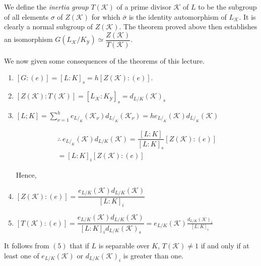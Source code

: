 We define the \textit{inertia group} $T(\mathscr{K})$ of a prime
divisor $\mathscr{K}$ of $L$ to be the subgroup of all elements
$\sigma$ of $Z(\mathscr{K})$ for which  $\bar{\sigma}$ is the identity
automorphism of $L_\mathscr{K}$. It is clearly a normal subgroup of
$Z(\mathscr{K})$. The theorem proved above then establishes an
isomorphism $G(L_\mathscr{K} / K_\mathscr{Y}) \simeq
\dfrac{Z(\mathscr{K})}{T(\mathscr{K})}$. 

We now given some consequences of the theorems of this lecture.
\begin{enumerate}
\item $[G: (e)]= [L:K]_s = h[Z(\mathscr{K}):(e)]$. 
\item $[Z(\mathscr{K}): T(\mathscr{K})]= [ L_\mathscr{K} :
  K_\mathscr{Y}]_s =d_{L /K}{(\mathscr{K})}_s$ 
\item $[L;K] = \sum\limits_{\nu = 1}^{h} e_{L /_K}(\mathscr{K}_\nu)
  d_{L /_K}(\mathscr{K}_\nu) =h e_{L / _K}(\mathscr{K}) d_{L /_K}
  (\mathscr{K})$ 

  \begin{multline*}
    \therefore ~e_{L / _K}(\mathscr{K}) d_{L /K}(\mathscr{K}) =
    \dfrac{[L:K]}{[L:K]_s} [Z(\mathscr{K}):(e)]\\
    = {[L:K]_i [Z(\mathscr{K}): (e)]} 
  \end{multline*} 

 Hence,\pageoriginale 
\item $[Z(\mathscr{K}) : (e) ] = \dfrac{e_{L/K}{(\mathscr{K})}
  d_{L/K} {(\mathscr{K})}}{[L:K]_i}$ 
\item $[T(\mathscr{K}) :(e) ] = \dfrac{{e_{L /K} {(\mathscr{K})}
    d_{L/K} {(\mathscr{K})}}}{[L : K]_i d_{L/K}{(\mathscr{K})}_s} =e_{L/
  K} (\mathscr{K}) \frac{d_{L/K}(\mathscr{K})_i}{[L : K]_i}$ 
\end{enumerate}

It follows from $(5)$ that if $L$ is separable over $K$,
$T(\mathscr{K}) \neq 1$ if and only if at least one of 
$e_{L/K}(\mathscr{K})$ or $d_{L/K}(\mathscr{K})_i$ is greater than one. 
